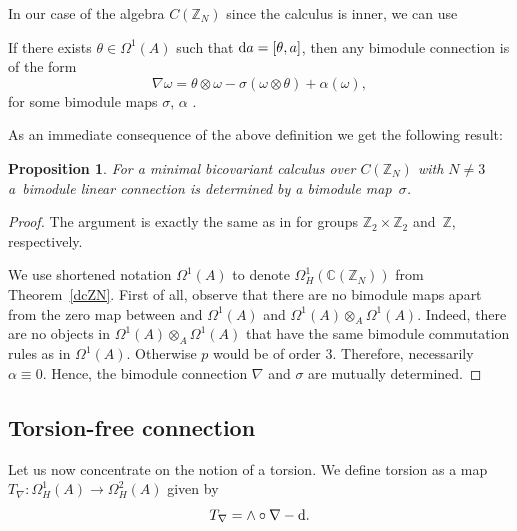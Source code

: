 \documentclass[10pt,a4paper]{amsart}
\numberwithin{equation}{section}
\newtheorem{Proposition}[Theorem]{Proposition}
 { \theoremstyle{definition}
\newtheorem{Definition}[Theorem]{Definition}
\newtheorem{Example}[Theorem]{Example}
\newtheorem{Remark}[Theorem]{Remark} }
\newcommand{\Z}{\mathbb{Z}}
\newcommand{\C}{\mathbb{C}}
\begin{document}
In our case of the algebra $C(\Z_N)$ since the calculus is inner, we can use
\begin{Remark}
If there exists $\theta\in \Omega^1(A)$ such that ${\rm d}a=[\theta, a]$, then any bimodule connection is of the form
\begin{equation}
\nabla\omega=\theta\otimes\omega-\sigma(\omega\otimes\theta)+\alpha(\omega),
\label{inner_connection}
\end{equation}
for some bimodule maps $\sigma$, $\alpha$ \cite[Theorem~2.1]{M13}.
\end{Remark}
As an immediate consequence of the above definition we get the following result:
\begin{Proposition}\label{connection_determined}
For a minimal bicovariant calculus over $C(\Z_N)$ with $N\neq 3$ a~bimodule linear connection is determined by a bimodule map~$\sigma$.
\end{Proposition}
\begin{proof}

The argument is exactly the same as in \cite{M1,M2} for groups $\mathbb{Z}_2\times\mathbb{Z}_2$ and~$\mathbb{Z}$, respectively.

We use shortened notation $\Omega^1(A)$ to denote $\Omega^1_H(\C(\Z_N))$ from Theorem~\ref{dcZN}.
First of all, observe that there are no bimodule maps apart from the zero map between
and $\Omega^1(A)$ and $\Omega^1(A) \otimes_A \Omega^1(A)$. Indeed, there are no objects in
$\Omega^1(A) \otimes_A \Omega^1(A)$ that have the same bimodule commutation rules as in
$\Omega^1(A)$. Otherwise $p$ would be of order $3$.
Therefore, necessarily $\alpha\equiv0$. Hence, the bimodule connection $\nabla$ and $\sigma$ are mutually determined.
\end{proof}
\subsection{Torsion-free connection}

Let us now concentrate on the notion of a torsion. We define torsion as a map $T_\nabla\colon \Omega^1_H(A)\rightarrow \Omega^2_H(A)$
given by
\begin{equation*}
T_\nabla=\wedge \circ \nabla-{\rm d}.
\end{equation*}
\end{document}
